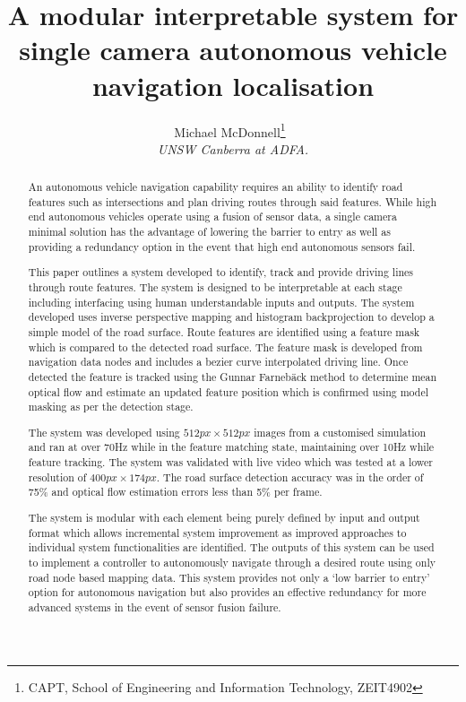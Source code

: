 \documentclass[]{aiaa-tc}%
\title{A modular interpretable system for single camera autonomous vehicle navigation localisation}
\author{
  Michael McDonnell\thanks{CAPT, School of Engineering and Information Technology, ZEIT4902}\
  \\
  {\normalsize\itshape
   UNSW Canberra at ADFA.}\\
  }
\begin{document}
\maketitle


\begin{abstract}

An autonomous vehicle navigation capability requires an ability to identify road features such as intersections and plan driving routes through said features. While high end autonomous vehicles operate using a fusion of sensor data, a single camera minimal solution has the advantage of lowering the barrier to entry as well as providing a redundancy option in the event that high end autonomous sensors fail.

This paper outlines a system developed to identify, track and provide driving lines through route features. The system is designed to be interpretable at each stage including interfacing using human understandable inputs and outputs. The system developed uses inverse perspective mapping and histogram backprojection to develop a simple model of the road surface. Route features are identified using a feature mask which is compared to the detected road surface. The feature mask is developed from navigation data nodes and includes a bezier curve interpolated driving line. Once detected the feature is tracked using the Gunnar Farneb{\"a}ck method to determine mean optical flow and estimate an updated feature position which is confirmed using model masking as per the detection stage.

The system was developed using $512px \times 512px$ images from a customised simulation and ran at over 70Hz while in the feature matching state, maintaining over 10Hz while feature tracking. The system was validated with live video which was tested at a lower resolution of $400px \times 174px$. The road surface detection accuracy was in the order of 75\% and optical flow estimation errors less than 5\% per frame.

The system is modular with each element being purely defined by input and output format which allows incremental system improvement as improved approaches to individual system functionalities are identified. The outputs of this system can be used to implement a controller to autonomously navigate through a desired route using only road node based mapping data. This system provides not only a `low barrier to entry' option for autonomous navigation but also provides an effective redundancy for more advanced systems in the event of sensor fusion failure.

\end{abstract}
\end{document}
